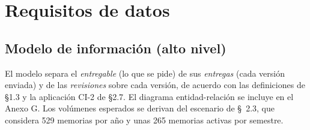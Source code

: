 \documentclass[10pt,a4paper]{article}
\begin{document}
\clearpage
\section{Requisitos de datos}

\subsection{Modelo de información (alto nivel)}
El modelo separa el \emph{entregable} (lo que se pide) de sus \emph{entregas} (cada versión enviada) y de las \emph{revisiones} sobre cada versión, de acuerdo con las definiciones de §1.3 y la aplicación CI-2 de §2.7. El diagrama entidad-relación se incluye en el Anexo G. Los volúmenes esperados se derivan del escenario de \S~2.3, que considera 529 memorias por año y unas 265 memorias activas por semestre.
\end{document}
